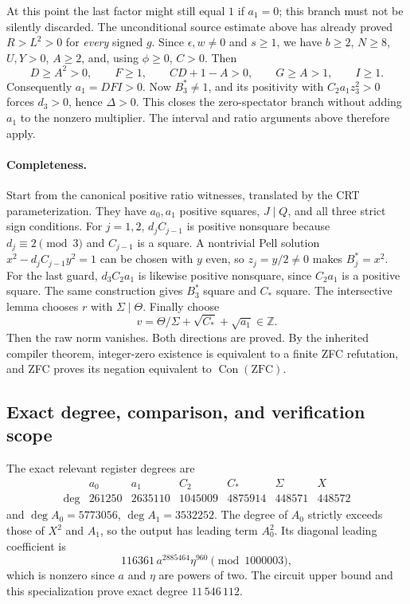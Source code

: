 At this point the last factor might still equal $1$ if $a_1=0$; this branch
must not be silently discarded. The unconditional source estimate above
has already proved $R>L^2>0$ for \emph{every} signed $g$. Since
$\epsilon,w\ne0$ and $s\ge1$, we have $b\ge2$, $N\ge8$, $U,Y>0$,
$A\ge2$, and, using $\phi\ge0$, $C>0$. Then
\[
 D\ge A^2>0,\qquad F\ge1,\qquad
 CD+1-A>0,\qquad G\ge A>1,\qquad I\ge1.
\]
Consequently $a_1=DFI>0$. Now $B_3^*\ne1$, and its positivity with
$C_2a_1z_3^2>0$ forces $d_3>0$, hence $\Delta>0$. This closes the
zero-spectator branch without adding $a_1$ to the nonzero multiplier.
The interval and ratio arguments above therefore apply.

\paragraph{Completeness.}
Start from the canonical positive ratio witnesses, translated by the CRT
parameterization. They have $a_0,a_1$ positive squares, $J\mid Q$, and all
three strict sign conditions. For $j=1,2$, $d_jC_{j-1}$ is positive
nonsquare because $d_j\equiv2\pmod3$ and $C_{j-1}$ is a square.
A nontrivial Pell solution $x^2-d_jC_{j-1}y^2=1$ can be chosen with $y$
even, so $z_j=y/2\ne0$ makes $B_j^*=x^2$. For the last guard,
$d_3C_2a_1$ is likewise positive nonsquare, since $C_2a_1$ is a positive
square. The same construction gives $B_3^*$ square and $C_*$ square.
The intersective lemma chooses $r$ with $\Sigma\mid\Theta$. Finally choose
\[
 v=\Theta/\Sigma+\sqrt{C_*}+\sqrt{a_1}\in\mathbb Z.
\]
Then the raw norm vanishes. Both directions are proved. By the inherited
compiler theorem, integer-zero existence is equivalent to a finite ZFC
refutation, and ZFC proves its negation equivalent to
$\operatorname{Con}(\mathrm{ZFC})$.

\subsection{Exact degree, comparison, and verification scope}
The exact relevant register degrees are
\[
\begin{array}{c|rrrrrr}
 &a_0&a_1&C_2&C_*&\Sigma&X\\\hline
 \deg&261250&2635110&1045009&4875914&448571&448572
\end{array}
\]
and $\deg A_0=5773056$, $\deg A_1=3532252$. The degree of $A_0$
strictly exceeds those of $X^2$ and $A_1$, so the output has leading term
$A_0^2$. Its diagonal leading coefficient is
\[
 116361\,a^{2885464}\eta^{960}\pmod{1000003},
\]
which is nonzero since $a$ and $\eta$ are powers of two. The circuit upper
bound and this specialization prove exact degree $11\,546\,112$.

